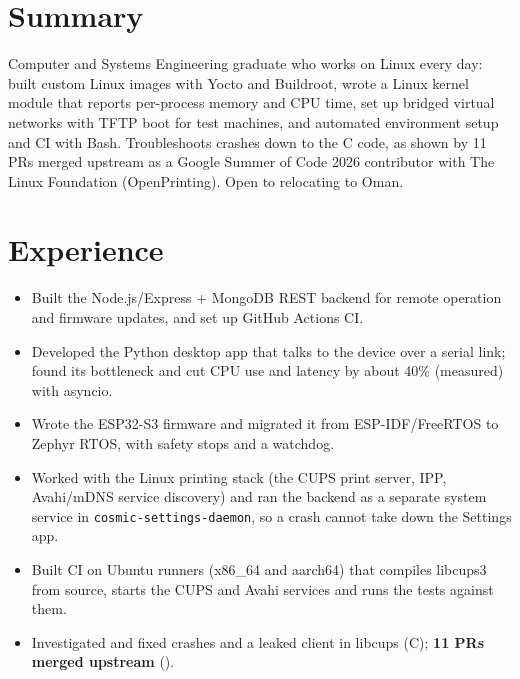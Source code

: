 \documentclass[10pt]{article}
\begin{document}

\section*{Summary}
Computer and Systems Engineering graduate who works on Linux every day: built custom Linux images with Yocto and Buildroot, wrote a Linux kernel module that reports per-process memory and CPU time, set up bridged virtual networks with TFTP boot for test machines, and automated environment setup and CI with Bash. Troubleshoots crashes down to the C code, as shown by 11 PRs merged upstream as a Google Summer of Code 2026 contributor with The Linux Foundation (OpenPrinting). Open to relocating to Oman.

\section*{Experience}
\begin{itemize}
  \item Built the Node.js/Express + MongoDB REST backend for remote operation and firmware updates, and set up GitHub Actions CI.
  \item Developed the Python desktop app that talks to the device over a serial link; found its bottleneck and cut CPU use and latency by about 40\% (measured) with asyncio.
  \item Wrote the ESP32-S3 firmware and migrated it from ESP-IDF/FreeRTOS to Zephyr RTOS, with safety stops and a watchdog.
\end{itemize}
\begin{itemize}
  \item Worked with the Linux printing stack (the CUPS print server, IPP, Avahi/mDNS service discovery) and ran the backend as a separate system service in \texttt{cosmic-settings-daemon}, so a crash cannot take down the Settings app.
  \item Built CI on Ubuntu runners (x86\_64 and aarch64) that compiles libcups3 from source, starts the CUPS and Avahi services and runs the tests against them.
  \item Investigated and fixed crashes and a leaked client in libcups (C); \textbf{11 PRs merged upstream} ().
\end{itemize}
\end{document}
